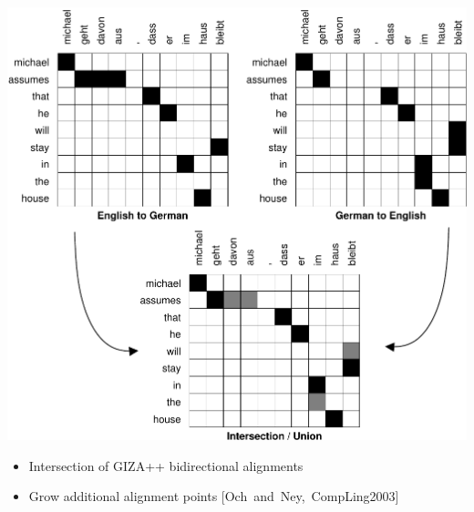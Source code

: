 \documentclass[landscape]{slides}
\begin{document}
\vspace{-5mm}
\begin{center} 
\includegraphics[scale=0.75]{michael-bidirectional.pdf}
\end{center}\vspace{-5mm}
\begin{itemize} \itemsep -5mm
\item Intersection of GIZA++ bidirectional alignments
\item Grow additional alignment points [Och~and~Ney,~CompLing2003]
\end{itemize}


 
\end{document}
